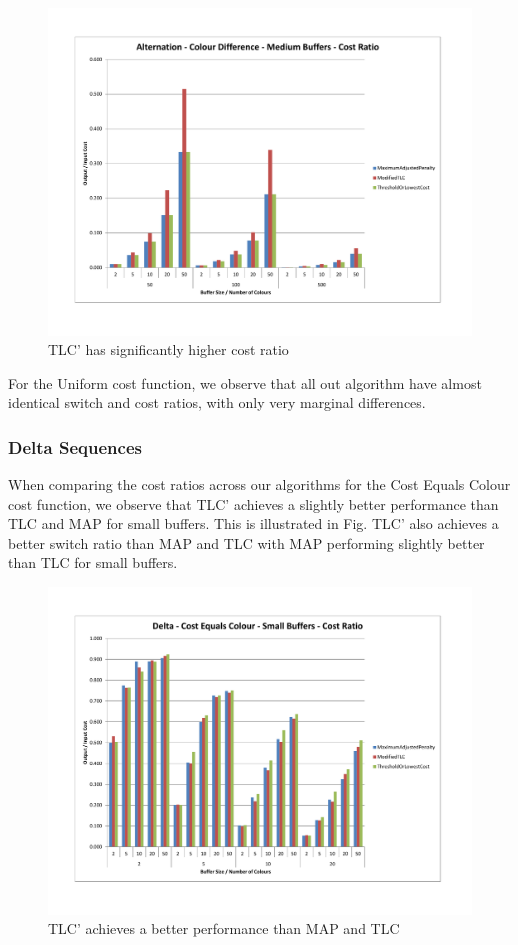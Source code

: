 \begin{figure}[ht]
\centering 
\includegraphics[scale=0.60]{Alternation-cd-medium-cost.pdf}
\caption{TLC' has significantly higher cost ratio}
\label{alternationCDMediumCost}
\end{figure} 

For the Uniform cost function, we observe that all out algorithm have almost identical switch and cost ratios, with only very marginal differences. 

\subsubsection{Delta Sequences}

When comparing the cost ratios across our algorithms for the Cost Equals Colour cost function, we observe that TLC' achieves a slightly better performance than TLC and MAP for small buffers. This is illustrated in Fig. TLC' also achieves a better switch ratio than MAP and TLC with MAP performing slightly better than TLC for small buffers.

\begin{figure}[ht]
\centering 
\includegraphics[scale=0.60]{Delta-cc-small-cost.pdf}
\caption{TLC' achieves a better performance than MAP and TLC}
\label{deltaCCSmallCost}
\end{figure}   

